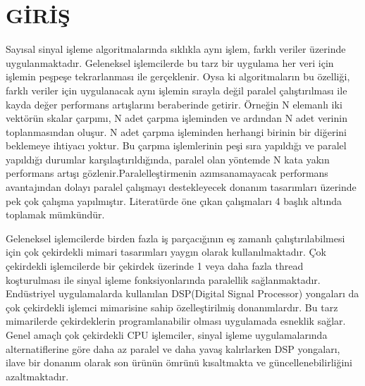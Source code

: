 \chapter{G\.{I}R\.{I}\c{S}} \label{chapter:giris}
Sayısal sinyal işleme algoritmalarında sıklıkla aynı işlem, farklı veriler üzerinde uygulanmaktadır. Geleneksel işlemcilerde bu tarz bir uygulama her veri için işlemin peşpeşe tekrarlanması ile gerçeklenir. Oysa ki algoritmaların bu özelliği, farklı veriler için uygulanacak aynı işlemin sırayla değil paralel çalıştırılması ile kayda değer performans artışlarını beraberinde getirir. Örneğin N elemanlı iki vektörün skalar çarpımı, N adet çarpma işleminden ve ardından N adet verinin toplanmasından oluşur. N adet çarpma işleminden herhangi birinin bir diğerini beklemeye ihtiyacı yoktur. Bu çarpma işlemlerinin peşi sıra yapıldığı ve paralel yapıldığı durumlar karşılaştırıldığında, paralel olan yöntemde N kata yakın performans artışı gözlenir.Paralelleştirmenin azımsanamayacak performans avantajından dolayı paralel çalışmayı destekleyecek donanım tasarımları üzerinde pek çok çalışma yapılmıştır. Literatürde öne çıkan çalışmaları 4 başlık altında toplamak mümkündür.  \par

Geleneksel işlemcilerde birden fazla iş parçacığının eş zamanlı çalıştırılabilmesi için çok çekirdekli mimari tasarımları yaygın olarak kullanılmaktadır. Çok çekirdekli işlemcilerde bir çekirdek üzerinde 1 veya daha fazla thread koşturulması ile sinyal işleme fonksiyonlarında paralellik sağlanmaktadır. Endüstriyel uygulamalarda kullanılan DSP(Digital Signal Processor) yongaları da çok çekirdekli işlemci mimarisine sahip özelleştirilmiş donanımlardır.\cite{dspArchitectures} Bu tarz mimarilerde çekirdeklerin programlanabilir olması uygulamada esneklik sağlar. Genel amaçlı çok çekirdekli CPU işlemciler, sinyal işleme uygulamalarında alternatiflerine göre daha az paralel ve daha yavaş kalırlarken DSP yongaları, ilave bir donanım olarak son ürünün ömrünü kısaltmakta ve güncellenebilirliğini azaltmaktadır.\cite{hallmans2013gpgpu} \par

